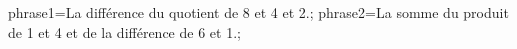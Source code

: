 \documentclass[exercice]{thedocument}%
\begin{document}
%
    \>phrase1={La différence du quotient de 8 et 4 et 2.};%
    \>phrase2={La somme du produit de 1 et 4 et de la différence de 6 et 1.};%
\end{document}
